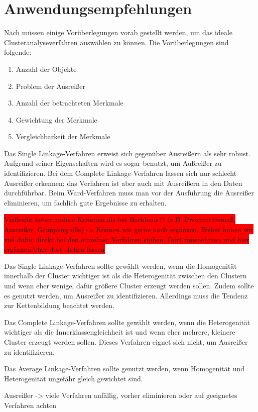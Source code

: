 \chapter{Anwendungsempfehlungen}

Nach \citet[S. 510]{Backhaus.2016} müssen einige Vorüberlegungen vorab gestellt werden, um das ideale Clusteranalyseverfahren auswählen zu können. Die Vorüberlegungen sind folgende:
\begin{enumerate}
    \item Anzahl der Objekte
    \item Problem der Ausreißer
    \item Anzahl der betrachteten Merkmale
    \item Gewichtung der Merkmale
    \item Vergleichbarkeit der Merkmale
\end{enumerate}

Das Single Linkage-Verfahren erweist sich gegenüber Ausreißern als sehr robust. Aufgrund seiner Eigenschaften wird es sogar benutzt, um Außreißer zu identifizieren. Bei dem Complete Linkage-Verfahren lassen sich nur schlecht Ausreißer erkennen; das Verfahren ist aber auch mit Ausreißern in den Daten durchführbar. Beim Ward-Verfahren muss man vor der Ausführung die Ausreißer eliminieren, um fachlich gute Ergebnisse zu erhalten.

\colorbox{red}{Vielleicht lieber andere Kriterien als bei Backhaus?? (z.B. Proximitätsmaß, Ausreißer, Gruppengröße) -> Können wir gerne noch ergänzen. Bisher haben wir viel dafür direkt bei den einzelnen Verfahren stehen. Dort rausnehmen und hier ergänzen?eher dort stehen lassen}

Das Single Linkage-Verfahren sollte gewählt werden, wenn die Homogenität innerhalb der Cluster wichtiger ist als die Heterogenität zwischen den Clustern und wenn eher wenige, dafür größere Cluster erzeugt werden sollen. Zudem sollte es genutzt werden, um Ausreißer zu identifizieren. Allerdings muss die Tendenz zur Kettenbildung beachtet werden.

Das Complete Linkage-Verfahren sollte gewählt werden, wenn die Heterogenität wichtiger als die Innerklassengleichheit ist und wenn eher mehrere, kleinere Cluster erzeugt werden sollen. Dieses Verfahren eignet sich nicht, um Ausreißer zu identifizieren.

Das Average Linkage-Verfahren sollte genutzt werden, wenn Homogenität und Heterogenität ungefähr gleich gewichtet sind.

Ausreißer -> viele Verfahren anfällig, vorher eliminieren oder auf geeignetes Verfahren achten

